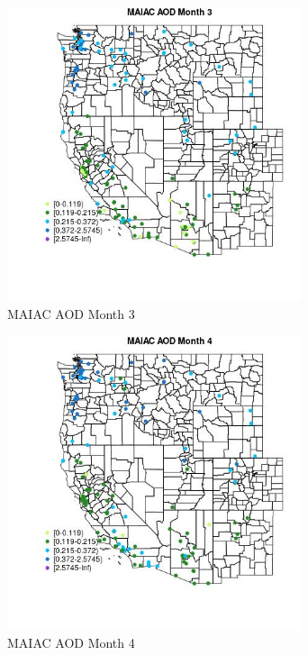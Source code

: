 \begin{figure} 
\centering  
\includegraphics[width=0.77\textwidth]{Code_Outputs/Report_ML_input_PM25_Step4_part_e_de_duplicated_aves_MapObsMo3MAIAC_AOD.jpg} 
\caption{\label{fig:Report_ML_input_PM25_Step4_part_e_de_duplicated_avesMapObsMo3MAIAC_AOD}MAIAC AOD Month 3} 
\end{figure} 
 

\clearpage 

\begin{figure} 
\centering  
\includegraphics[width=0.77\textwidth]{Code_Outputs/Report_ML_input_PM25_Step4_part_e_de_duplicated_aves_MapObsMo4MAIAC_AOD.jpg} 
\caption{\label{fig:Report_ML_input_PM25_Step4_part_e_de_duplicated_avesMapObsMo4MAIAC_AOD}MAIAC AOD Month 4} 
\end{figure} 
 


